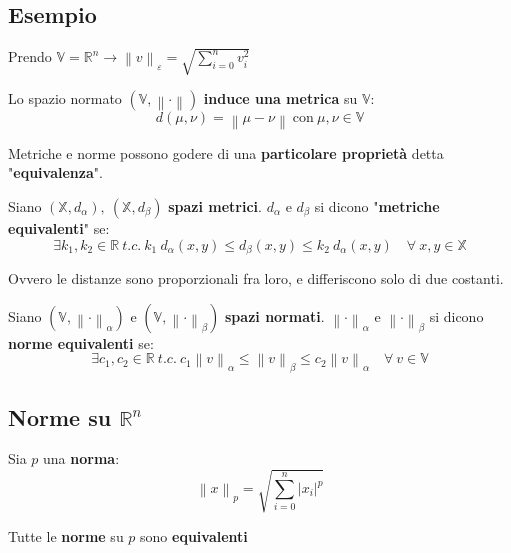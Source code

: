 \documentclass[a4paper, oneside]{article}
\newcommand\X{\mathbb{X}}
\newcommand\R{\mathbb{R}}
\newcommand\norma{\left\lVert\cdot\right\rVert}
\newcommand\V{\mathbb{V}}
\begin{document}
\subsection{Esempio}
Prendo $\displaystyle \V=\R^n \rightarrow \left\lVert v\right\rVert_\varepsilon = \sqrt{\sum_{i=0}^{n} v_i^2}$

\begin{proposition}
    Lo spazio normato $(\V,\norma)$ \textbf{induce una metrica} su $\V$:
    \[d(\mu,\nu)=\left\lVert \mu-\nu\right\rVert \ \text{con} \ \mu,\nu\in\V\]
\end{proposition}
\noindent Metriche e norme possono godere di una \textbf{particolare proprietà} detta "\textbf{equivalenza}".

\begin{definition}
    Siano $(\X,d_\alpha), \ (\X,d_\beta)$ \textbf{spazi metrici}. $d_\alpha$ e $d_\beta$ si dicono "\textbf{metriche equivalenti}" se:
    \[\exists k_1,k_2\in\R \ t.c. \ k_1 \ d_\alpha(x,y) \leq d_\beta(x,y) \leq k_2 \ d_\alpha(x,y) \quad \forall \ x,y\in\X\]
\end{definition}
\noindent Ovvero le distanze sono proporzionali fra loro, e differiscono solo di due costanti.\\
\begin{definition}
    Siano $(\V,\norma_\alpha)$ e $(\V,\norma_\beta)$ \textbf{spazi normati}. $\norma_\alpha$ e $\norma_\beta$ si dicono \textbf{norme equivalenti} se:
    \[\exists c_1,c_2\in\R \ t.c. \ c_1 \left\lVert v\right\rVert_\alpha \leq \left\lVert v\right\rVert_\beta \leq c_2 \left\lVert v\right\rVert_\alpha \quad \forall \ v\in\V\]
\end{definition}


\subsection{Norme su $\R^n$}
    Sia $p$ una \textbf{norma}:
    \[\left\lVert x\right\rVert_p = \sqrt{\sum_{i=0}^{n} |x_i|^p} \]

\begin{theorem}
    Tutte le \textbf{norme} su $p$ sono \textbf{equivalenti}
\end{theorem}
\end{document}
